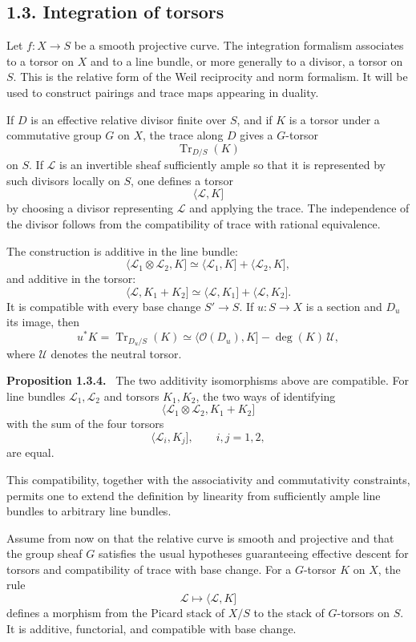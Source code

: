 \documentclass[12pt]{article}
\newcommand{\Ll}{\mathcal L}
\newcommand{\Ocal}{\mathcal O}
\newcommand{\Uu}{\mathcal U}
\newenvironment{statement}[1]{\par\medskip\noindent\textbf{#1.}\ }{\par\medskip}
\begin{document}
\subsection*{1.3. Integration of torsors}

Let \(f:X\to S\) be a smooth projective curve. The integration formalism associates to a torsor on \(X\) and to a line bundle, or more generally to a divisor, a torsor on \(S\). This is the relative form of the Weil reciprocity and norm formalism. It will be used to construct pairings and trace maps appearing in duality.

If \(D\) is an effective relative divisor finite over \(S\), and if \(K\) is a torsor under a commutative group \(G\) on \(X\), the trace along \(D\) gives a \(G\)-torsor
\[
\operatorname{Tr}_{D/S}(K)
\]
on \(S\). If \(\Ll\) is an invertible sheaf sufficiently ample so that it is represented by such divisors locally on \(S\), one defines a torsor
\[
\langle \Ll,K]
\]
by choosing a divisor representing \(\Ll\) and applying the trace. The independence of the divisor follows from the compatibility of trace with rational equivalence.

The construction is additive in the line bundle:
\[
\langle \Ll_1\otimes\Ll_2,K]
\simeq
\langle \Ll_1,K]+\langle \Ll_2,K],
\]
and additive in the torsor:
\[
\langle \Ll,K_1+K_2]
\simeq
\langle \Ll,K_1]+\langle \Ll,K_2].
\]
It is compatible with every base change \(S'\to S\). If \(u:S\to X\) is a section and \(D_u\) its image, then
\[
u^*K=\operatorname{Tr}_{D_u/S}(K)\simeq \langle \Ocal(D_u),K]-\deg(K)\,\Uu,
\]
where \(\Uu\) denotes the neutral torsor.

\begin{statement}{Proposition 1.3.4}
The two additivity isomorphisms above are compatible. For line bundles \(\Ll_1,\Ll_2\) and torsors \(K_1,K_2\), the two ways of identifying
\[
\langle \Ll_1\otimes\Ll_2,K_1+K_2]
\]
with the sum of the four torsors
\[
\langle \Ll_i,K_j],\qquad i,j=1,2,
\]
are equal.
\end{statement}

This compatibility, together with the associativity and commutativity constraints, permits one to extend the definition by linearity from sufficiently ample line bundles to arbitrary line bundles.

Assume from now on that the relative curve is smooth and projective and that the group sheaf \(G\) satisfies the usual hypotheses guaranteeing effective descent for torsors and compatibility of trace with base change. For a \(G\)-torsor \(K\) on \(X\), the rule
\[
\Ll\longmapsto \langle \Ll,K]
\]
defines a morphism from the Picard stack of \(X/S\) to the stack of \(G\)-torsors on \(S\). It is additive, functorial, and compatible with base change.
\end{document}
